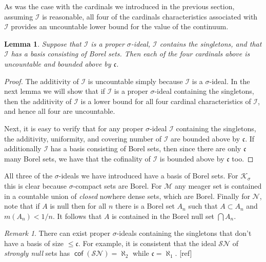 \documentclass[11pt,oneside,a4paper]{amsbook}
\newcommand{\Null}{\mathcal N}
\newcommand{\Meager}{\mathcal M}
\newcommand{\Ksigma}{\mathcal K_\sigma}
\DeclareMathOperator{\cof}{\mathsf{cof}}
\theoremstyle{definition}
\theoremstyle{plain}
\newtheorem{lemma}[theorem]{Lemma}
\theoremstyle{definition}
\theoremstyle{remark}
\newtheorem{remark}[theorem]{Remark}
\numberwithin{equation}{section}
\numberwithin{figure}{section}
\begin{document}
As was the case with the cardinals we introduced in the previous section, assuming $\mathcal I$ is reasonable, all four of the cardinals characteristics associated with $\mathcal I$ provides an uncountable lower bound for the value of the continuum.

\begin{lemma}
  \label{lem:ideal-cards}
  Suppose that $\mathcal I$ is a proper $\sigma$-ideal, $\mathcal I$ contains the singletons, and that $\mathcal I$ has a basis consisting of Borel sets. Then each of the four cardinals above is uncountable and bounded above by $\mathfrak c$.
\end{lemma}

\begin{proof}
  The additivity of $\mathcal I$ is uncountable simply because $\mathcal I$ is a $\sigma$-ideal. In the next lemma we will show that if $\mathcal I$ is a proper $\sigma$-ideal containing the singletons, then the additivity of $\mathcal I$ is a lower bound for all four cardinal characteristics of $\mathcal I$, and hence all four are uncountable.

  Next, it is easy to verify that for any proper $\sigma$-ideal $\mathcal I$ containing the singletons, the additivity, uniformity, and covering number of $\mathcal I$ are bounded above by $\mathfrak c$. If additionally $\mathcal I$ has a basis consisting of Borel sets, then since there are only $\mathfrak c$ many Borel sets, we have that the cofinality of $\mathcal I$ is bounded above by $\mathfrak c$ too.
\end{proof}

All three of the $\sigma$-ideals we have introduced have a basis of Borel sets. For $\Ksigma$ this is clear because $\sigma$-compact sets are Borel. For $\Meager$ any meager set is contained in a countable union of \emph{closed} nowhere dense sets, which are Borel. Finally for $\Null$, note that if $A$ is null then for all $n$ there is a Borel set $A_n$ such that $A\subset A_n$ and $m(A_n)<1/n$. It follows that $A$ is contained in the Borel null set $\bigcap A_n$.

\begin{remark}
  There can exist proper $\sigma$-ideals containing the singletons that don't have a basis of size $\leq\mathfrak c$. For example, it is consistent that the ideal $\mathcal{SN}$ of \emph{strongly null} sets has $\cof(\mathcal{SN})=\aleph_2$ while $\mathfrak c=\aleph_1$.
  [ref] %
\end{remark}
\end{document}
